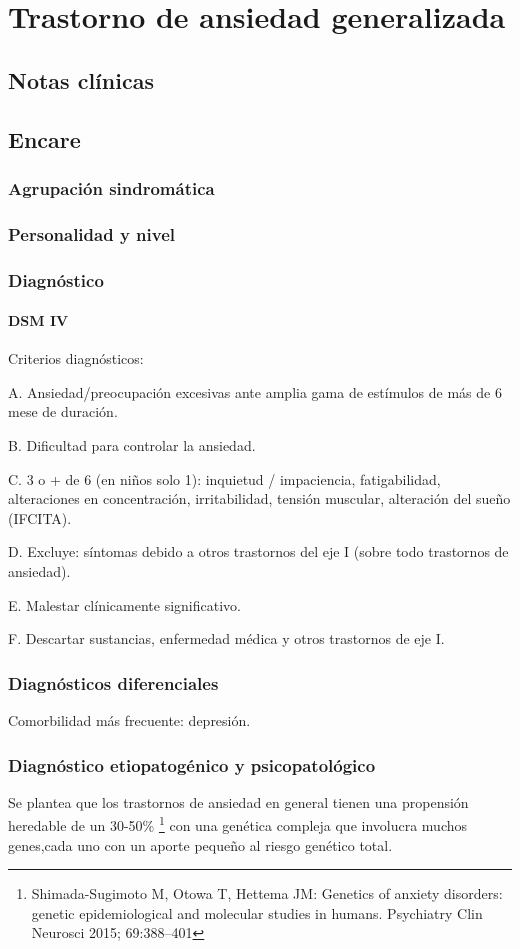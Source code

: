 \chapter{Trastorno de ansiedad generalizada}
\section*{Notas clínicas}
\section*{Encare}
\subsection*{Agrupación sindromática}
\subsection*{Personalidad y nivel}
\subsection*{Diagnóstico}
\subsubsection{DSM IV}
Criterios diagnósticos:

A. Ansiedad/preocupación excesivas ante amplia gama de estímulos de más de 6 mese de duración.

B. Dificultad para controlar la ansiedad.

C. 3 o + de 6 (en niños solo 1): inquietud / impaciencia, fatigabilidad, alteraciones en concentración, irritabilidad, tensión muscular, alteración del sueño (IFCITA).

D. Excluye: síntomas debido a otros trastornos del eje I (sobre todo trastornos de ansiedad).

E. Malestar clínicamente significativo.

F. Descartar sustancias, enfermedad médica y otros trastornos de eje I.

\subsection*{Diagnósticos diferenciales}

Comorbilidad más frecuente: depresión.

\subsection*{Diagnóstico etiopatogénico y psicopatológico}
Se plantea que los trastornos de ansiedad en general tienen una propensión heredable de un 30-50\% \footnote{Shimada-Sugimoto M, Otowa T, Hettema JM: Genetics of anxiety disorders: genetic epidemiological and molecular studies in humans. Psychiatry Clin Neurosci 2015; 69:388–401} con una genética compleja que involucra muchos genes,cada uno con un aporte pequeño al riesgo genético total.


